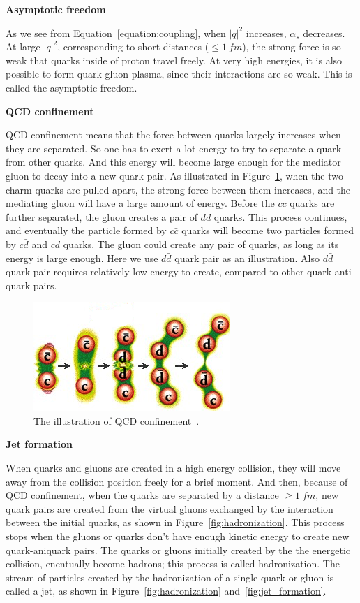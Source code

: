  
{\bf Asymptotic freedom}

As we see from Equation~\ref{equation:coupling}, 
when $|q|^2$ increases, $\alpha_{s}$ decreases. 
At  large $|q|^2$, corresponding to
short distances (${\leq}1~fm$),  the strong force 
is so weak that quarks inside of proton travel freely.  At very high energies, 
it is also possible to form quark-gluon plasma, since their interactions are so weak. 
This is called the asymptotic freedom. 

{\bf QCD confinement}


QCD confinement means that the force between quarks largely increases when they are separated. 
So one has to exert a lot energy to try to separate a quark from other quarks. And this energy will
become large enough for the mediator gluon to decay into a new quark pair. 
As illustrated in Figure~\ref{fig:color_field},  when the two charm quarks are pulled apart, the 
strong force between them increases, and the mediating gluon will have 
a large amount of energy. Before the $c\bar{c}$ quarks are further separated, the gluon  
creates a pair of $d\bar{d}$ quarks. This process continues,  and eventually the particle formed by 
$c\bar{c}$ quarks will become 
two particles formed by $c\bar{d}$ and $\bar{c}d$ quarks.
The gluon could create any pair of quarks, 
as long as its energy is large enough. Here we use $d\bar{d}$ quark pair as an illustration. 
Also $d\bar{d}$ quark pair requires relatively low energy to create, compared to other quark anti-quark pairs. 

\begin{figure}[htb]
\centering
\includegraphics[width=.7\textwidth]{figures/color_field.jpg}
\caption{The illustration of QCD confinement~\cite{web:qcd_confinement}.}
\label{fig:color_field}
\end{figure}  



{\bf Jet formation}

When quarks and gluons are created in a high energy collision, they will
move away from the collision position freely for a brief moment. And then,
because of QCD confinement, when the quarks are separated by a distance
${\geq} 1~fm$, new quark pairs are created from the virtual gluons exchanged by 
the interaction between the initial quarks, as shown in Figure~\ref{fig:hadronization}. 
This process stops when the gluons or quarks don't have enough kinetic energy to create new
quark-aniquark pairs. The quarks or gluons initially created by the the energetic collision,
enentually become hadrons; this process is called hadronization. The stream of particles
created by the hadronization of a single quark or gluon is called a jet, as shown in 
Figure~\ref{fig:hadronization} and~\ref{fig:jet_formation}. 


